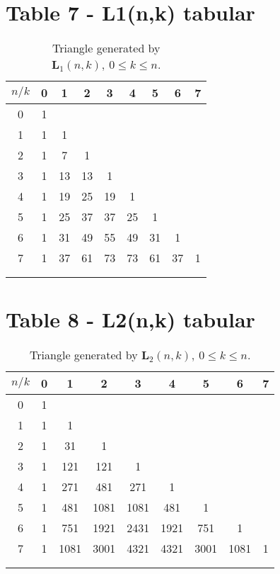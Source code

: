 \documentclass[12pt, letterpaper]{amsart}
\theoremstyle{definition}
\theoremstyle{remark}
\numberwithin{equation}{section}
\begin{document}
\section{Table 7 - L1(n,k) tabular}
\begin{table}[H]
\begin{tabular}{c|cccccccc}
  $n/k$ &0   &1  &2   &3   &4  &5    &6     &7     \\[3px] \hline
    0   &1   &   &    &    &   &     &      &      \\
    1   &1   &1  &    &    &   &     &      &      \\
    2   &1   &7  &1   &    &   &     &      &      \\
    3   &1   &13 &13  &1   &   &     &      &      \\
    4   &1   &19 &25  &19  &1  &     &      &      \\
    5   &1   &25 &37  &37  &25 &1    &      &      \\
    6   &1   &31 &49  &55  &49 &31   &1     &      \\
    7   &1   &37 &61  &73  &73 &61   &37    &1 \\
  \\\noalign{\smallskip\smallskip}
\end{tabular}
\caption{Triangle generated by $\mathbf{L}_1(n,k), \ 0\leq k\leq n$.} \label{fig_1}
\end{table}
\section{Table 8 - L2(n,k) tabular}
\begin{table}[H]
\begin{tabular}{c|cccccccc}
  $n/k$ &0   &1    &2     &3     &4    &5    &6     &7     \\[3px] \hline
    0   &1   &     &      &      &     &     &      &      \\
    1   &1   &1    &      &      &     &     &      &      \\
    2   &1   &31   &1     &      &     &     &      &      \\
    3   &1   &121  &121   &1     &     &     &      &      \\
    4   &1   &271  &481   &271   &1    &     &      &      \\
    5   &1   &481  &1081  &1081  &481  &1    &      &      \\
    6   &1   &751  &1921  &2431  &1921 &751  &1     &      \\
    7   &1   &1081 &3001  &4321  &4321 &3001 &1081  &1 \\
  \\\noalign{\smallskip\smallskip}
\end{tabular}
\caption{Triangle generated by $\mathbf{L}_2(n,k), \ 0\leq k\leq n$.} \label{fig_2}
\end{table}
\end{document}

